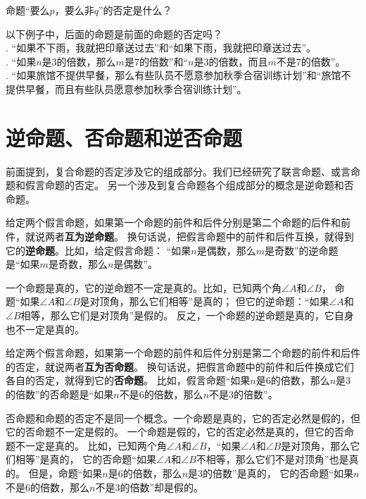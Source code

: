\begin{sk}\label{sk:2-1-0}
    命题“要么$p$，要么非$q$”的否定是什么？
\end{sk}

\begin{xt}\label{xt:2-1-0}
    以下例子中，后面的命题是前面的命题的否定吗？\\
    . “如果不下雨，我就把印章送过去”和“如果下雨，我就把印章送过去”。\\
    . “如果$n$是$3$的倍数，那么$m$是$7$的倍数”和“$n$是$3$的倍数，而且$m$不是$7$的倍数”。\\
    . “如果旅馆不提供早餐，那么有些队员不愿意参加秋季合宿训练计划”和“旅馆不提供早餐，而且有些队员愿意参加秋季合宿训练计划”。
\end{xt}

\section{逆命题、否命题和逆否命题}
前面提到，复合命题的否定涉及它的组成部分。我们已经研究了联言命题、或言命题和假言命题的否定。
另一个涉及到复合命题各个组成部分的概念是逆命题和否命题。

给定两个假言命题，如果第一个命题的前件和后件分别是第二个命题的后件和前件，就说两者\textbf{互为逆命题}。
换句话说，把假言命题中的前件和后件互换，就得到它的\textbf{逆命题}。比如，给定假言命题：
“如果$n$是偶数，那么$m$是奇数”的逆命题是“如果$m$是奇数，那么$n$是偶数”。

一个命题是真的，它的逆命题不一定是真的。比如，已知两个角$\angle A$和$\angle B$，
命题“如果$\angle A$和$\angle B$是对顶角，那么它们相等”是真的；
但它的逆命题：“如果$\angle A$和$\angle B$相等，那么它们是对顶角”是假的。
反之，一个命题的逆命题是真的，它自身也不一定是真的。

给定两个假言命题，如果第一个命题的前件和后件分别是第二个命题的前件和后件的否定，就说两者\textbf{互为否命题}。
换句话说，把假言命题中的前件和后件换成它们各自的否定，就得到它的\textbf{否命题}。
比如，假言命题“如果$n$是$6$的倍数，那么$n$是$3$的倍数”的否命题是“如果$n$不是$6$的倍数，那么$n$不是$3$的倍数”。

否命题和命题的否定不是同一个概念。一个命题是真的，它的否定必然是假的，但它的否命题不一定是假的。
一个命题是假的，它的否定必然是真的，但它的否命题不一定是真的。
比如，已知两个角$\angle A$和$\angle B$，“如果$\angle A$和$\angle B$是对顶角，那么它们相等”是真的，
它的否命题“如果$\angle A$和$\angle B$不相等，那么它们不是对顶角”也是真的。
但是，命题“如果$n$是$6$的倍数，那么$n$是$3$的倍数”是真的，
它的否命题“如果$n$不是$6$的倍数，那么$n$不是$3$的倍数”却是假的。

